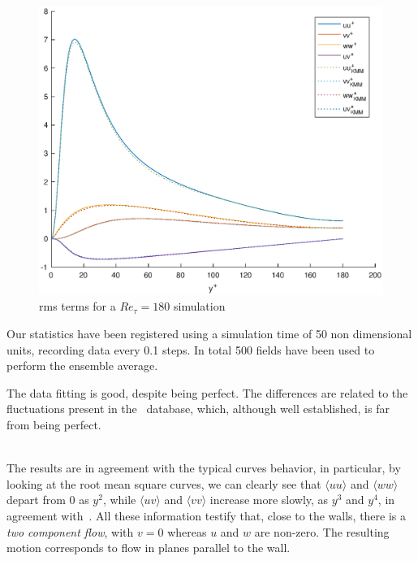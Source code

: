 \begin{figure}
\begin{center}
\includegraphics[scale=0.55]{grafici/budget_180.eps}
\caption{rms terms for a $Re_{\tau}=180$ simulation}
\label{budget_180}
\end{center} 
\end{figure}


Our statistics have been registered using a simulation time of 50 non dimensional units, recording data every 0.1 steps.
In total 500 fields have been used to perform the ensemble average. \par

The data fitting is good, despite being perfect. The differences are related to the fluctuations present in the~\cite{kim_moin_moser} database, which, although well established, is far from being perfect. \\~\par

The results are in agreement with the typical curves behavior, in particular, by looking at the root mean square curves, we can clearly see that $\langle uu\rangle$ and $\langle ww\rangle$ depart from 0 as $y^{2}$, while $\langle uv\rangle$ and $\langle vv\rangle$ increase more slowly, as $y^{3}$ and $y^{4}$, in agreement with~\cite[284]{pope}.
All these information testify that, close to the walls, there is a \emph{two component flow}, with $v=0$ whereas $u$ and $w$ are non-zero. The resulting motion corresponds to flow in planes parallel to the wall. \\~\par

